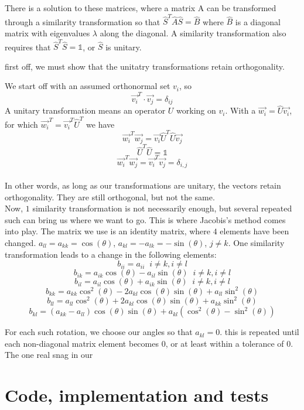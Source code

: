 \documentclass[10pt, twocolumn]{article}
\begin{document}
There is a solution to these matrices, where a matrix A can be transformed through a similarity 
transformation so that $\hat{S}^T \hat{A} \hat{S} = \hat{B}$ where $\hat{B}$ is a diagonal matrix 
with eigenvalues $\lambda$ along the diagonal. A similarity transformation also requires that 
$\hat{S}^T\hat{S} = \mathds{1}$, or $\hat{S}$ is unitary. 

first off, we must show that the unitatry transformations retain orthogonality. 

We start off with an assumed orthonormal set $v_i$, so
\[
\vec{v_i}^T \cdot \vec{v_j} = \delta_{ij}
\]
A unitary transformation means an operator $U$ working on $v_i$.
With a $\vec{w_{i}} = \hat{U}\vec{v_{i}}$, for which 
$\vec{w_{i}}^T = \vec{v_{i}}^T\hat{U}^T$ we have 
\[
    \vec{w_{i}}^T\vec{w_{j}} = \vec{v_i} \hat{U}^T \hat{U} \vec{v_j} 
\]
\[
    \hat{U}^T \hat{U} = \mathds{1} 
\]
\[
    \vec{w_i}^T\vec{w_j} = \vec{v_i}^T\vec{v_j} = \delta_{i,j}
\]\\

In other words, as long as our transformations are unitary, the vectors retain 
orthogonality. They are still orthogonal, but not the same. \\

Now, $1$ similarity transformation is not necessarily enough, but several repeated such can 
bring us where we want to go. This is where Jacobis's method comes into play. The matrix we use is
an identity matrix, where $4$ elements have been changed. $a_{ll} = a_{kk} = \cos(\theta)$, 
$a_{kl} = -a_{lk} = -\sin(\theta)$, $j \neq k$. One similarity transformation leads to a change in 
the following elements: 
\[ b_{ii} = a_{ii} \; \; i \neq k, i \neq l \]
\[ b_{ik} = a_{ik}\cos(\theta) - a_{il}\sin(\theta) \; \; i \neq k, i \neq l \]
\[ b_{il} = a_{il}\cos(\theta) + a_{ik}\sin(\theta) \; \; i \neq k, i \neq l \]
\[ b_{kk} = a_{kk}\cos^2(\theta) - 2a_{kl}\cos(\theta)\sin(\theta) + a_{ll}\sin^2(\theta) \]
\[ b_{ll} = a_{ll}\cos^2(\theta) + 2a_{kl}\cos(\theta)\sin(\theta) + a_{kk}\sin^2(\theta) \]
\[ b_{kl} = (a_{kk} - a_{ll})\cos(\theta)\sin(\theta) + a_{kl}(\cos^2(\theta) - \sin^2(\theta)) \]

For each such rotation, we choose our angles so that $a_{kl} = 0$. this is repeated until each non-diagonal
matrix element becomes 0, or at least within a tolerance of 0. The one real snag in our 


\section{Code, implementation and tests}
\end{document}
